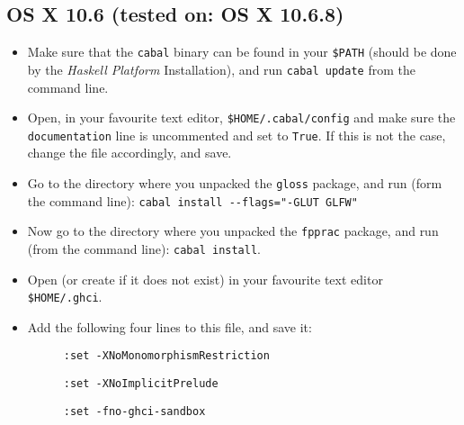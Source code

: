 \documentclass[]{article}
\begin{document}
\subsection{OS X 10.6 (tested on: OS X 10.6.8)}
\begin{itemize}
  \item Make sure that the \texttt{cabal} binary can be found in your \texttt{\$PATH} (should be done by the \emph{Haskell Platform} Installation), and run \texttt{cabal update} from the command line.
  \item Open, in your favourite text editor, \texttt{\$HOME/.cabal/config} and make sure the \texttt{documentation} line is uncommented and set to \texttt{True}. If this is not the case, change the file accordingly, and save.
  \item Go to the directory where you unpacked the \texttt{gloss} package, and run (form the command line): \texttt{cabal install -{}-flags="-GLUT GLFW"}
  \item Now go to the directory where you unpacked the \texttt{fpprac} package, and run (from the command line): \texttt{cabal install}.
  \item Open (or create if it does not exist) in your favourite text editor \texttt{\$HOME/.ghci}.
  \item Add the following four lines to this file, and save it:
  \begin{description}
    \item[] \texttt{:set -XNoMonomorphismRestriction}
    \item[] \texttt{:set -XNoImplicitPrelude}
    \item[] \texttt{:set -fno-ghci-sandbox}
  \end{description}
\end{itemize}
\end{document}
